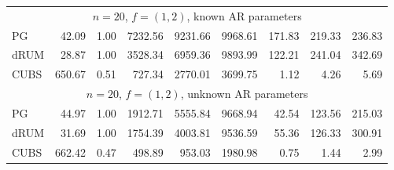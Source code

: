 \documentclass[12pt]{article}
\begin{document}
\begin{table}
\begin{center}
\begin{tabular}{l r r r r r r r r }
      \multicolumn{9}{c}{$n=20$, $f = (1,2)$, known AR parameters} \\
      PG     &    42.09 &     1.00 &   7232.56 &   9231.66 &   9968.61 &    171.83 &    219.33 &    236.83 \\ 
      dRUM   &    28.87 &     1.00 &   3528.34 &   6959.36 &   9893.99 &    122.21 &    241.04 &    342.69 \\
      CUBS   &   650.67 &     0.51 &    727.34 &   2770.01 &   3699.75 &      1.12 &      4.26 &      5.69
      \\ %


      \multicolumn{9}{c}{$n=20$, $f = (1,2)$, unknown AR parameters} \\
      PG     &    44.97 &     1.00 &   1912.71 &   5555.84 &   9668.94 &     42.54 &    123.56 &    215.03 \\ 
      dRUM   &    31.69 &     1.00 &   1754.39 &   4003.81 &   9536.59 &     55.36 &    126.33 &    300.91 \\
      CUBS   &   662.42 &     0.47 &    498.89 &    953.03 &   1980.98 &      0.75 &      1.44 &      2.99
      \\ %



\end{tabular}
\end{center}
\end{table}
\end{document}
